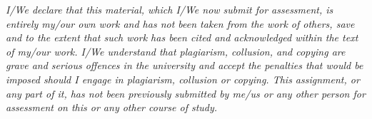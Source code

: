 \documentclass[12pt,english]{report}
\begin{document}
\frontespizio
\beforepreface
\textit{I/We declare that this material, which I/We now submit for assessment, is entirely my/our own work and has not been taken from the work of others, save and to the extent that such work has been cited and acknowledged within the text of my/our work. I/We understand that plagiarism, collusion, and copying are grave and serious offences in the university and accept the penalties that would be imposed should I engage in plagiarism, collusion or copying. This assignment, or any part of it, has not been previously submitted by me/us or any other person for assessment on this or any other course of study.}
\afterpreface









%
%



\end{document}
